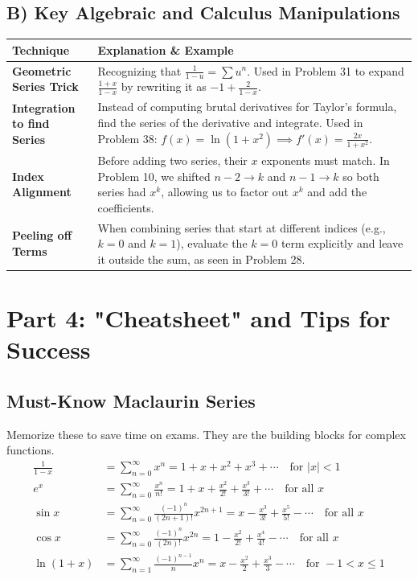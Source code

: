\documentclass[11pt, letterpaper]{article}
\theoremstyle{definition}
\theoremstyle{remark}
\begin{document}
\subsection{B) Key Algebraic and Calculus Manipulations}
\begin{table}[h!]
\renewcommand{\arraystretch}{1.5}
\begin{tabularx}{\textwidth}{l X}
\toprule
\textbf{Technique} & \textbf{Explanation \& Example} \\
\midrule
\textbf{Geometric Series Trick} & Recognizing that $\frac{1}{1-u} = \sum u^n$. Used in Problem 31 to expand $\frac{1+x}{1-x}$ by rewriting it as $-1 + \frac{2}{1-x}$. \\
\addlinespace[4pt]
\textbf{Integration to find Series} & Instead of computing brutal derivatives for Taylor's formula, find the series of the derivative and integrate. Used in Problem 38: $f(x) = \ln(1+x^2) \implies f'(x) = \frac{2x}{1+x^2}$. \\
\addlinespace[4pt]
\textbf{Index Alignment} & Before adding two series, their $x$ exponents must match. In Problem 10, we shifted $n-2 \to k$ and $n-1 \to k$ so both series had $x^k$, allowing us to factor out $x^k$ and add the coefficients. \\
\addlinespace[4pt]
\textbf{Peeling off Terms} & When combining series that start at different indices (e.g., $k=0$ and $k=1$), evaluate the $k=0$ term explicitly and leave it outside the sum, as seen in Problem 28. \\
\bottomrule
\end{tabularx}
\end{table}

\newpage
\section{Part 4: "Cheatsheet" and Tips for Success}

\subsection{Must-Know Maclaurin Series}
Memorize these to save time on exams. They are the building blocks for complex functions.
\begin{align*}
    \frac{1}{1-x} &= \sum_{n=0}^{\infty} x^n = 1 + x + x^2 + x^3 + \cdots \quad \text{for } |x| < 1 \\
    e^x &= \sum_{n=0}^{\infty} \frac{x^n}{n!} = 1 + x + \frac{x^2}{2!} + \frac{x^3}{3!} + \cdots \quad \text{for all } x \\
    \sin x &= \sum_{n=0}^{\infty} \frac{(-1)^n}{(2n+1)!} x^{2n+1} = x - \frac{x^3}{3!} + \frac{x^5}{5!} - \cdots \quad \text{for all } x \\
    \cos x &= \sum_{n=0}^{\infty} \frac{(-1)^n}{(2n)!} x^{2n} = 1 - \frac{x^2}{2!} + \frac{x^4}{4!} - \cdots \quad \text{for all } x \\
    \ln(1+x) &= \sum_{n=1}^{\infty} \frac{(-1)^{n-1}}{n} x^n = x - \frac{x^2}{2} + \frac{x^3}{3} - \cdots \quad \text{for } -1 < x \le 1
\end{align*}
\end{document}
